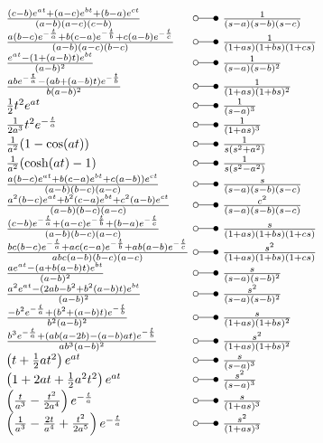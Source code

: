 \begin{footnotesize}
\[ \begin{array}{@{}l@{ ~ \laplace ~ }l@{}}
\frac{(c - b) e^{at} + (a - c) e^{bt} + (b - a) e^{ct}}{(a - b) (a - c) (c - b)} &
    \frac{1}{(s - a) (s - b) (s - c)} \\
\frac{a (b - c) e^{-\frac{t}{a}} + b (c - a) e^{-\frac{t}{b}} + c (a - b) e^{-\frac{t}{c}}}{(a - b) (a - c) (b - c)} &
    \frac{1}{(1 + as) (1 + bs) (1 + cs)} \\
\frac{e^{at} - (1 + (a - b) t) e^{bt}}{(a - b)^2} &
    \frac{1}{(s - a) (s - b)^2} \\
\frac{a b e^{-\frac{t}{a}} - (ab + (a - b) t) e^{-\frac{t}{b}}}{b (a - b)^2} &
    \frac{1}{(1 + as) (1 + bs)^2} \\
\frac{1}{2} t^2 e^{at} &
    \frac{1}{(s - a)^3} \\
\frac{1}{2 a^3} t^2 e^{-\frac{t}{a}} &
    \frac{1}{(1 + as)^3} \\
\frac{1}{a^2} (1 - \cos(at)) &
    \frac{1}{s (s^2 + a^2)} \\
\frac{1}{a^2} (\cosh(at) - 1) &
    \frac{1}{s (s^2 - a^2)} \\
\frac{a (b - c) e^{at} + b (c - a) e^{bt} + c (a - b)) e^{ct}}{(a - b) (b - c) (a - c)} &
    \frac{s}{(s - a) (s - b) (s - c)} \\
\frac{a^2 (b - c) e^{at} + b^2 (c - a) e^{bt} + c^2 (a - b) e^{ct}}{(a - b) (b - c) (a - c)} &
    \frac{c^2}{(s - a) (s - b) (s - c)} \\
\frac{(c - b) e^{-\frac{t}{a}} + (a - c) e^{-\frac{t}{b}} + (b - a) e^{-\frac{t}{c}}}{(a - b) (b - c) (a - c)} &
    \frac{s}{(1 + as) (1 + bs) (1 + cs)} \\
\frac{bc (b - c) e^{-\frac{t}{a}} + ac (c - a) e^{-\frac{t}{b}} + ab (a - b) e^{-\frac{t}{c}}}{abc (a - b) (b - c) (a - c)} &
    \frac{s^2}{(1 + as) (1 + bs) (1 + cs)} \\
\frac{a e^{at} - (a + b (a - b) t) e^{bt}}{(a - b)^2} &
    \frac{s}{(s - a) (s - b)^2} \\
\frac{a^2 e^{at} - (2 ab - b^2 + b^2 (a - b) t) e^{bt}}{(a - b)^2} &
    \frac{s^2}{(s - a) (s - b)^2} \\
\frac{-b^2 e^{-\frac{t}{a}} + (b^2 + (a - b) t) e^{-\frac{t}{b}}}{b^2 (a - b)^2} &
    \frac{s}{(1 + as) (1 + bs)^2} \\
\frac{b^3 e^{-\frac{t}{a}} + (ab (a - 2b) - (a - b) at) e^{-\frac{t}{b}}}{ab^3 (a - b)^2} &
    \frac{s^2}{(1 + as) (1 + bs)^2} \\
\left(t + \frac{1}{2} a t^2\right) e^{at} &
    \frac{s}{(s - a)^3} \\
\left(1 + 2at + \frac{1}{2} a^2 t^2\right) e^{at} &
    \frac{s^2}{(s - a)^3} \\
\left(\frac{t}{a^3} - \frac{t^2}{2 a^4}\right) e^{-\frac{t}{a}} &
    \frac{s}{(1 + as)^3} \\
\left(\frac{1}{a^3} - \frac{2t}{a^4} + \frac{t^2}{2 a^5}\right) e^{-\frac{t}{a}} &
    \frac{s^2}{(1 + as)^3} \\
\end{array} \]


\end{footnotesize}
